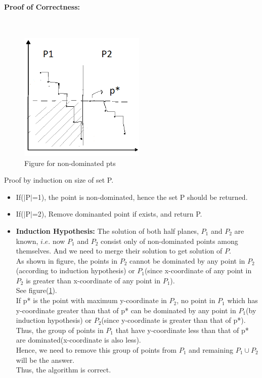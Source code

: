 \documentclass[pdftex,a4paper,12pt]{report}
\begin{document}
\paragraph{Proof of Correctness:} \makebox[2pt]{}\\
\begin{figure}[ht!]
\centering
\includegraphics[width=60mm]{p1.png}
\caption{Figure for non-dominated pts}
\label{fig}
\end{figure}

Proof by induction on size of set P.
\begin{itemize}
 \item If($\mid$P$\mid$=1), the point is non-dominated, hence the set P should be returned.
 \item If($\mid$P$\mid$=2), Remove dominanted point if exists, and return P.
 \item \textbf{Induction Hypothesis: } The solution of both half planes, $P_1$ and $P_2$ are known, $i.e.$ now $P_1$ and $P_2$ consist only of 
 non-dominated points among themselves. And we need to merge their solution to get solution of $P$.\\
 As shown in figure, the points in $P_2$ cannot be dominated by any point in $P_2$(according to induction hypothesis) or $P_1$(since x-coordinate of any point
 in $P_2$ is greater than x-coordinate of any point in $P_1$).\\
 See figure(\ref{fig}).\\
 If p* is the point with maximum y-coordinate in $P_2$, no point in $P_1$ which has y-coordinate greater than that of p* can be dominated by any point
 in $P_1$(by induction hypothesis) or $P_2$(since y-coordinate is greater than that of p*).\\
 Thus, the group of points in $P_1$ that have y-coordinate less than that of p* are dominated(x-coordinate is also less).\\
 Hence, we need to remove this group of points from $P_1$ and remaining $P_1 \cup P_2$ will be the answer.\\
 Thus, the algorithm is correct.
\end{itemize}
\end{document}
